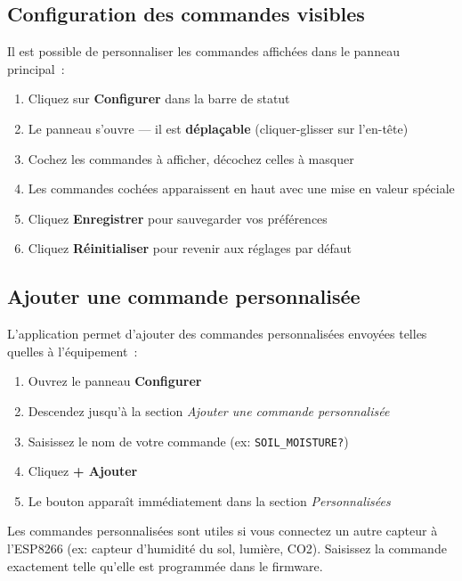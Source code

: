 \documentclass[a4paper,12pt]{article}
\newcommand{\tipbox}[2]{%
  \begin{tcolorbox}[mybox,
    colback=LightPurple, colframe=TipPurple,
    colbacktitle=TipPurple, coltitle=white,
    title={$\star$\enspace #1}]#2\end{tcolorbox}}
\newcommand{\cmd}[1]{\texttt{\colorbox{CodeBg}{\textcolor{PrimaryBlue}{#1}}}}
\begin{document}
\subsection{Configuration des commandes visibles}

Il est possible de personnaliser les commandes affich\'ees dans le panneau principal~:

\begin{enumerate}[noitemsep, label=\arabic*.]
  \item Cliquez sur \textbf{Configurer} dans la barre de statut
  \item Le panneau s'ouvre --- il est \textbf{d\'epla\c{c}able} (cliquer-glisser sur l'en-t\^ete)
  \item Cochez les commandes \`a afficher, d\'ecochez celles \`a masquer
  \item Les commandes coch\'ees apparaissent en haut avec une mise en valeur sp\'eciale
  \item Cliquez \textbf{Enregistrer} pour sauvegarder vos pr\'ef\'erences
  \item Cliquez \textbf{R\'einitialiser} pour revenir aux r\'eglages par d\'efaut
\end{enumerate}

\subsection{Ajouter une commande personnalis\'ee}

L'application permet d'ajouter des commandes personnalis\'ees envoy\'ees telles quelles \`a l'\'equipement~:

\begin{enumerate}[noitemsep, label=\arabic*.]
  \item Ouvrez le panneau \textbf{Configurer}
  \item Descendez jusqu'\`a la section \textit{Ajouter une commande personnalis\'ee}
  \item Saisissez le nom de votre commande (ex: \cmd{SOIL\_MOISTURE?})
  \item Cliquez \textbf{+ Ajouter}
  \item Le bouton appara\^it imm\'ediatement dans la section \textit{Personnalis\'ees}
\end{enumerate}

\tipbox{Cas d'usage des commandes personnalis\'ees}{
Les commandes personnalis\'ees sont utiles si vous connectez un autre capteur \`a l'ESP8266
(ex: capteur d'humidit\'e du sol, lumi\`ere, CO2). Saisissez la commande exactement telle
qu'elle est programm\'ee dans le firmware.
}
\end{document}
